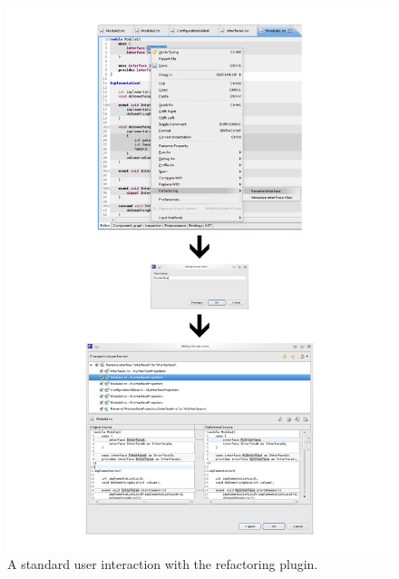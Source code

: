 \documentclass[a4paper,10pt]{report}
\begin{document}
\newpage
\begin{figure}[h]
\centering
\includegraphics[height=0.98\textheight]{userInputSequence.png}
\caption{A standard user interaction with the refactoring plugin.}
\label{UserInputSequence}
\end{figure}
\end{document}
